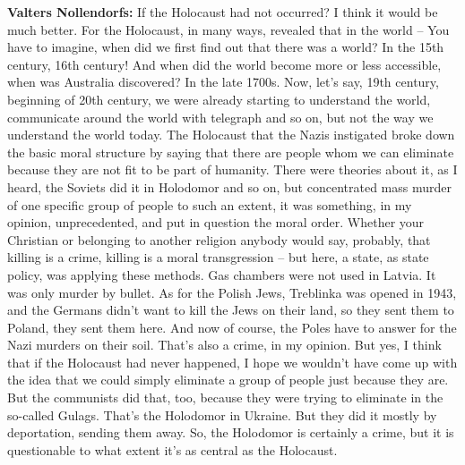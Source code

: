 \textbf{Valters Nollendorfs:} If the Holocaust had not occurred? I think it would be much better. For the Holocaust, in many ways, revealed that in the world – You have to imagine, when did we first find out that there was a world? In the 15th century, 16th century! And when did the world become more or less accessible, when was Australia discovered? In the late 1700s. Now, let’s say, 19th century, beginning of 20th century, we were already starting to understand the world, communicate around the world with telegraph and so on, but not the way we understand the world today. The Holocaust that the Nazis instigated broke down the basic moral structure by saying that there are people whom we can eliminate because they are not fit to be part of humanity. There were theories about it, as I heard, the Soviets did it in Holodomor and so on, but concentrated mass murder of one specific group of people to such an extent, it was something, in my opinion, unprecedented, and put in question the moral order. Whether your Christian or belonging to another religion anybody would say, probably, that killing is a crime, killing is a moral transgression – but here, a state, as state policy, was applying these methods. Gas chambers were not used in Latvia. It was only murder by bullet. As for the Polish Jews, Treblinka was opened in 1943, and the Germans didn’t want to kill the Jews on their land, so they sent them to Poland, they sent them here. And now of course, the Poles have to answer for the Nazi murders on their soil. That’s also a crime, in my opinion. But yes, I think that if the Holocaust had never happened, I hope we wouldn’t have come up with the idea that we could simply eliminate a group of people just because they are. But the communists did that, too, because they were trying to eliminate in the so-called Gulags. That’s the Holodomor in Ukraine. But they did it mostly by deportation, sending them away. So, the Holodomor is certainly a crime, but it is questionable to what extent it’s as central as the Holocaust. 
